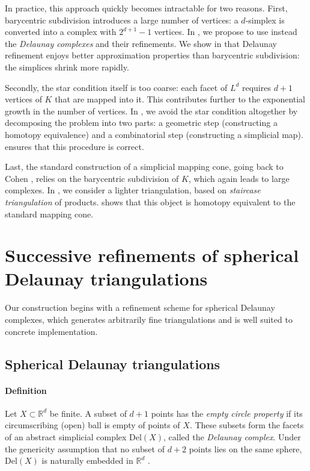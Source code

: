 \documentclass[a4paper,english,cleveref,autoref,thm-restate,nolineno]{socg-lipics-v2021}
\newcommand{\R}{\mathbb R}
\newcommand{\Del}[1] { \mathrm{Del}(#1) } %
\begin{document}
In practice, this approach quickly becomes intractable for two reasons.
First, barycentric subdivision introduces a large number of vertices: a $d$-simplex is converted into a complex with $2^{d+1}-1$ vertices.
In , we propose to use instead the \textit{Delaunay complexes} and their refinements.
We show in  that Delaunay refinement enjoys better approximation properties than barycentric subdivision: the simplices shrink more rapidly.

Secondly, the star condition itself is too coarse: each facet of $L^d$ requires $d+1$ vertices of $K$ that are mapped into it.
This contributes further to the exponential growth in the number of vertices.
In , we avoid the star condition altogether by decomposing the problem into two parts: a geometric step (constructing a homotopy equivalence) and a combinatorial step (constructing a simplicial map).
 ensures that this procedure is correct.

Last, the standard construction of a simplicial mapping cone, going back to Cohen \cite{cohen1967simplicial}, relies on the barycentric subdivision of $K$, which again leads to large complexes.
In , we consider a lighter triangulation, based on \textit{staircase triangulation} of products.
 shows that this object is homotopy equivalent to the standard mapping cone.

\section{Successive refinements of spherical Delaunay triangulations}
\label{sec:delaunay}

Our construction begins with a refinement scheme for spherical Delaunay complexes, which generates arbitrarily fine triangulations and is well suited to concrete implementation.

\subsection{Spherical Delaunay triangulations}
\label{subsec:delaunay_triangulations}

\paragraph*{Definition}

Let $X \subset \R^d$ be finite. 
A subset of $d+1$ points has the \emph{empty circle property} if its circumscribing (open) ball is empty of points of $X$.
These subsets form the facets of an abstract simplicial complex $\Del{X}$, called the \emph{Delaunay complex}.
Under the genericity assumption that no subset of $d+2$ points lies on the same sphere, $\Del{X}$ is naturally embedded in $\R^d$ \cite{boissonnat2018geometric}.
\end{document}
